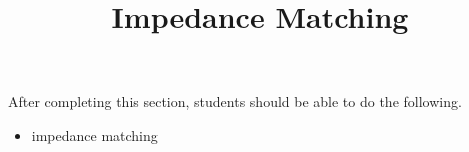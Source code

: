 \documentclass{ximera}
\title{Impedance Matching}
\begin{document}
\begin{abstract}
\end{abstract}

\maketitle

\begin{sectionOutcomes}

After completing this section, students should be able to do the following.

\begin{itemize}
\item impedance matching
\end{itemize}

\end{sectionOutcomes}
\end{document}
